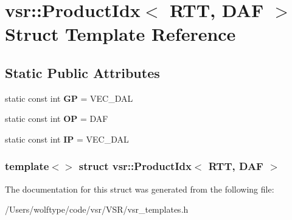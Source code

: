 \hypertarget{structvsr_1_1_product_idx_3_01_r_t_t_00_01_d_a_f_01_4}{\section{vsr\-:\-:Product\-Idx$<$ R\-T\-T, D\-A\-F $>$ Struct Template Reference}
\label{structvsr_1_1_product_idx_3_01_r_t_t_00_01_d_a_f_01_4}
}
\subsection*{Static Public Attributes}
\begin{DoxyCompactItemize}
\item 
\hypertarget{structvsr_1_1_product_idx_3_01_r_t_t_00_01_d_a_f_01_4_a69d354bc4a25e4679c2525a4fed58434}{static const int {\bfseries G\-P} = V\-E\-C\-\_\-\-D\-A\-L}\label{structvsr_1_1_product_idx_3_01_r_t_t_00_01_d_a_f_01_4_a69d354bc4a25e4679c2525a4fed58434}

\item 
\hypertarget{structvsr_1_1_product_idx_3_01_r_t_t_00_01_d_a_f_01_4_adeeae96c6f4f0b7435cea4e6b00f02ae}{static const int {\bfseries O\-P} = D\-A\-F}\label{structvsr_1_1_product_idx_3_01_r_t_t_00_01_d_a_f_01_4_adeeae96c6f4f0b7435cea4e6b00f02ae}

\item 
\hypertarget{structvsr_1_1_product_idx_3_01_r_t_t_00_01_d_a_f_01_4_ad07455562df904953e1ec973f8b4ffd3}{static const int {\bfseries I\-P} = V\-E\-C\-\_\-\-D\-A\-L}\label{structvsr_1_1_product_idx_3_01_r_t_t_00_01_d_a_f_01_4_ad07455562df904953e1ec973f8b4ffd3}

\end{DoxyCompactItemize}
\subsubsection*{template$<$$>$ struct vsr\-::\-Product\-Idx$<$ R\-T\-T, D\-A\-F $>$}



The documentation for this struct was generated from the following file\-:\begin{DoxyCompactItemize}
\item 
/\-Users/wolftype/code/vsr/\-V\-S\-R/vsr\-\_\-templates.\-h\end{DoxyCompactItemize}
